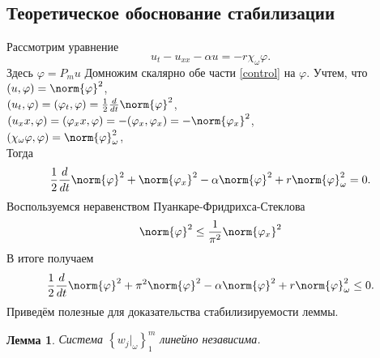 \subsection{Теоретическое обоснование стабилизации}
Рассмотрим уравнение
\begin{equation}\label{control}
	u_t - u_{xx} - \alpha u = -r\chi_{\omega}\varphi.
\end{equation}
Здесь $\varphi = P_mu$
Домножим скалярно обе части \eqref{control} на $\varphi$. Учтем, что\\
$(u, \varphi) = \norm{\varphi}^2$,\\
$(u_t, \varphi) = (\varphi_t, \varphi) = \frac{1}{2} \frac{d}{dt} \norm{\varphi}^2$,\\
$(u_xx, \varphi) = (\varphi_xx, \varphi) = -(\varphi_x, \varphi_x) = - \norm{\varphi_x}^2$,\\
$(\chi_{\omega}\varphi, \varphi) = \norm{\varphi}^2_{\omega}$,\\
Тогда
\begin{equation*}
\frac{1}{2} \frac{d}{dt} \norm{\varphi}^2  + \norm{\varphi_x}^2- \alpha \norm{\varphi}^2 + r \norm{\varphi}^2_{\omega} = 0.
\end{equation*}
Воспользуемся неравенством Пуанкаре-Фридрихса-Стеклова 
\begin{equation}
	\norm{\varphi}^2 \le \frac{1}{\pi^2} \norm{\varphi_x}^2
\end{equation}
В итоге получаем
\begin{equation}
	\frac{1}{2} \frac{d}{dt} \norm{\varphi}^2 + \pi^2 \norm{\varphi}^2 - \alpha \norm{\varphi}^2 + r \norm{\varphi}^2_{\omega} \le 0.	
\end{equation}
Приведём полезные для доказательства стабилизируемости леммы.

\newtheorem{lemma}{Лемма}

\begin{lemma}\label{util_lemma}
Система $\left\{ w_j|_{\omega} \right\}^m_1$ линейно независима.
\end{lemma}

